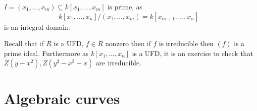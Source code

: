 \documentclass[a4paper]{article}
\begin{document}
\begin{eg}
  \(I = (x_1, \dots, x_m) \subseteq k[x_1, \dots, x_m]\) is prime, as
  \[
    k[x_1, \dots, x_n]/(x_1, \dots, x_m) = k[x_{m + 1}, \dots, x_n]
  \]
  is an integral domain.
\end{eg}

Recall that if \(R\) is a UFD, \(f \in R\) nonzero then if \(f\) is irreducible then \((f)\) is a prime ideal. Furthermore as \(k[x_1, \dots, x_n]\) is a UFD, it is an exercise to check that \(Z(y -x^2), Z(y^2 - x^3 + x)\) are irreducible.



























\iffalse

\section{Algebraic curves}
\end{document}
